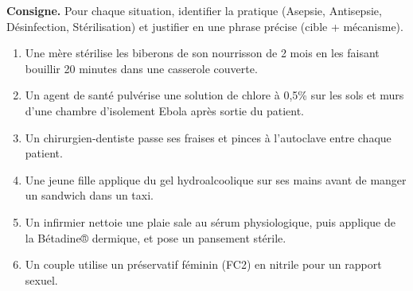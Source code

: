 \documentclass[11pt]{article}
\begin{document}
\begin{exercice}
\textbf{Consigne.} Pour chaque situation, identifier la pratique (Asepsie, Antisepsie, Désinfection, Stérilisation) et justifier en une phrase précise (cible + mécanisme).
\begin{enumerate}
    \item Une mère stérilise les biberons de son nourrisson de 2 mois en les faisant bouillir 20 minutes dans une casserole couverte.
    \item Un agent de santé pulvérise une solution de chlore à 0,5\% sur les sols et murs d'une chambre d'isolement Ebola après sortie du patient.
    \item Un chirurgien-dentiste passe ses fraises et pinces à l'autoclave entre chaque patient.
    \item Une jeune fille applique du gel hydroalcoolique sur ses mains avant de manger un sandwich dans un taxi.
    \item Un infirmier nettoie une plaie sale au sérum physiologique, puis applique de la Bétadine® dermique, et pose un pansement stérile.
    \item Un couple utilise un préservatif féminin (FC2) en nitrile pour un rapport sexuel.
\end{enumerate}
\end{exercice}
\end{document}
